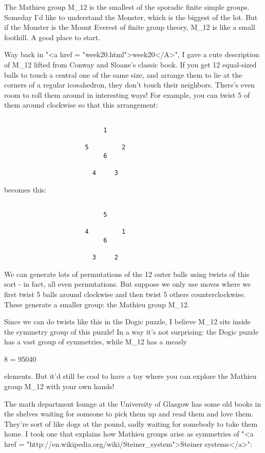 The Mathieu group M_{12} is the smallest of the sporadic finite simple
groups.  Someday I'd like to understand the Monster, which is the 
biggest of the lot.  But if the Monster is the Mount Everest of finite 
group theory, M_{12} is like a small foothill.  A good place to start.

Way back in "<a href = "week20.html">week20</A>", I gave a
cute description of M_{12} lifted from Conway and Sloane's
classic book.  If you get 12 equal-sized balls to touch a central one
of the same size, and arrange them to lie at the corners of a regular
icosahedron, they don't touch their neighbors.  There's even room to
roll them around in interesting ways!  For example, you can twist 5 of
them around clockwise so that this arrangement:


\begin{verbatim}

                           1
 
                      5         2
                           6
                        
                        4     3
\end{verbatim}
    
becomes this: 


\begin{verbatim}

                           5
 
                      4         1
                           6
                        
                        3     2
\end{verbatim}
    
We can generate lots of permutations of the 12 outer balls using 
twists of this sort - in fact, all even permutations.  But suppose
we only use moves where we first twist 5 balls around clockwise and 
then twist 5 others counterclockwise.  These generate a smaller group: 
the Mathieu group M_{12}.

Since we can do twists like this in the Dogic puzzle, I believe
M_{12} sits inside the symmetry group of this puzzle!  In a
way it's not surprising: the Dogic puzzle has a vast group of
symmetries, while M_{12} has a measly

8     = 95040

elements.  But it'd still be cool to have a toy where you can explore 
the Mathieu group M_{12} with your own hands!

The math department lounge at the University of Glasgow has some old 
books in the shelves waiting for someone to pick them up and read them
and love them.  They're sort of like dogs at the pound, sadly waiting 
for somebody to take them home.  I took one that explains how Mathieu 
groups arise as symmetries of "<a href = "http://en.wikipedia.org/wiki/Steiner_system">Steiner systems</a>":

